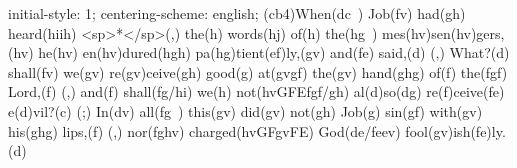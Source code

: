 initial-style: 1;
centering-scheme: english;
(cb4)When(dc~) Job(fv) had(gh) heard(hiih) <sp>*</sp>(,) the(h) words(hj) of(h) the(hg~) mes(hv)sen(hv)gers,(hv) he(hv) en(hv)dured(hgh) pa(hg)tient(ef)ly,(gv) and(fe) said,(d) (,) What?(d) shall(fv) we(gv) re(gv)ceive(gh) good(g) at(gvgf) the(gv) hand(ghg) of(f) the(fgf) Lord,(f) (,) and(f) shall(fg/hi) we(h) not(hvGFEfgf/gh) al(d)so(dg) re(f)ceive(fe) e(d)vil?(c) (;) In(dv) all(fg~) this(gv) did(gv) not(gh) Job(g) sin(gf) with(gv) his(ghg) lips,(f) (,) nor(fghv) charged(hvGFgvFE) God(de/feev) fool(gv)ish(fe)ly.(d)
